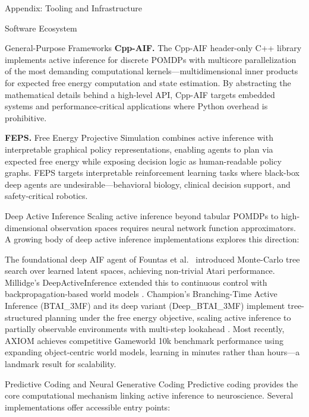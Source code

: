 \documentclass[
  ignorenonframetext,
]{beamer}
\begin{document}
\begin{frame}[fragile]{Appendix: Tooling and Infrastructure
\label{sec:tooling}}
\begin{block}{Software Ecosystem}
\begin{block}{General-Purpose Frameworks}
\textbf{Cpp-AIF.} The Cpp-AIF header-only C++ library
\citep{gregoretti2023cppaif} implements active inference for discrete
POMDPs with multicore parallelization of the most demanding
computational kernels---multidimensional inner products for expected
free energy computation and state estimation. By abstracting the
mathematical details behind a high-level API, Cpp-AIF targets embedded
systems and performance-critical applications where Python overhead is
prohibitive.

\textbf{FEPS.} Free Energy Projective Simulation \citep{pazem2024feps}
combines active inference with interpretable graphical policy
representations, enabling agents to plan via expected free energy while
exposing decision logic as human-readable policy graphs. FEPS targets
interpretable reinforcement learning tasks where black-box deep agents
are undesirable---behavioral biology, clinical decision support, and
safety-critical robotics.
\end{block}

\begin{block}{Deep Active Inference}
\protect{}\label{deep-active-inference}
Scaling active inference beyond tabular POMDPs to high-dimensional
observation spaces requires neural network function approximators. A
growing body of deep active inference implementations explores this
direction:

The foundational deep AIF agent of Fountas et
al.~\citep{fountas2020deep} introduced Monte-Carlo tree search over
learned latent spaces, achieving non-trivial Atari performance.
Millidge's DeepActiveInference extended this to continuous control with
backpropagation-based world models \citep{millidge2020deep}. Champion's
Branching-Time Active Inference (BTAI\_3MF) and its deep variant
(Deep\_BTAI\_3MF) implement tree-structured planning under the free
energy objective, scaling active inference to partially observable
environments with multi-step lookahead \citep{champion2021realizing}.
Most recently, AXIOM \citep{heins2025axiom} achieves competitive
Gameworld 10k benchmark performance using expanding object-centric world
models, learning in minutes rather than hours---a landmark result for
scalability.
\end{block}

\begin{block}{Predictive Coding and Neural Generative Coding}
\protect{}\label{predictive-coding-and-neural-generative-coding}
Predictive coding provides the core computational mechanism linking
active inference to neuroscience. Several implementations offer
accessible entry points:


\end{block}
\end{block}
\end{frame}
\end{document}
